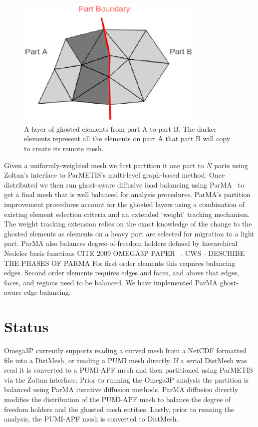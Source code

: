 \documentclass[a4paper]{article}
\begin{document}
\begin{figure}[ht]
\centering
\includegraphics[width=0.8\textwidth]{ghost.eps} 
\caption{\label{fig:ghost3} A layer of ghosted elements from part A to part B. The darker elements represent all the elements on part A that part B will copy to create its remote mesh.}
\end{figure}

Given a
uniformly-weighted mesh we first partition it one part to $N$ parts using
Zoltan's interface to ParMETIS's multi-level graph-based method.
Once distributed we then run ghost-aware diffusive load balancing using
ParMA~\cite{SmithParma2015} to get a final mesh that is well balanced for
analysis procedures.
ParMA's partition improvement procedures account for
the ghosted layers using a combination of existing element selection criteria
and an extended `weight' tracking mechanism.
The weight tracking extension relies on the exact knowledge of the change to the
ghosted elements as elements on a heavy part are selected for migration to a
light part.
ParMA also balances degree-of-freedom holders defined by 
hierarchical Nedelec basis functions CITE 2009 OMEGA3P PAPER ~\cite{ingelstrom2006new}.
CWS - DESCRIBE THE PHASES OF PARMA
For first order elements this requires balancing edges.
Second order elements requires edges and faces, and above that edges, faces, and
regions need to be balanced.
We have implemented ParMA ghost-aware edge balancing.

\section{Status}\label{sec:software}
Omega3P currently supports reading a curved mesh from a NetCDF formatted file
into a DistMesh, or reading a PUMI mesh directly.
If a serial DistMesh was read it is converted to a PUMI-APF mesh and then 
partitioned using ParMETIS via the Zoltan interface.
Prior to running the Omega3P analysis the partition is balanced using ParMA
iterative diffusion methods.
ParMA diffusion directly modifies the distribution of the PUMI-APF mesh to
balance the degree of freedom holders and the ghosted mesh entities.
Lastly, prior to running the analysis, the PUMI-APF mesh is converted to
DistMesh.
\end{document}

